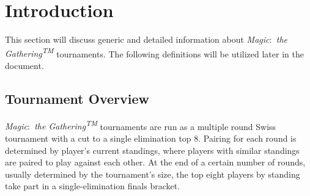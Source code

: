 \documentclass[11pt]{article}
\newcommand{\mtg}{\textit{Magic$\colon$ the Gathering\textsuperscript{TM}} }
\begin{document}
        \newpage

    \section{Introduction}
        This section will discuss generic and detailed information about \mtg tournaments. The following definitions will be utilized later in the document.

        \subsection{Tournament Overview}
        \mtg tournaments are run as a multiple round Swiss tournament with a cut to a single elimination top 8. Pairing for each round is determined by player's current standings, where players with similar standings are paired to play against each other. At the end of a certain number of rounds, usually determined by the tournament's size, the top eight players by standing take part in a single-elimination finals bracket.
\end{document}
